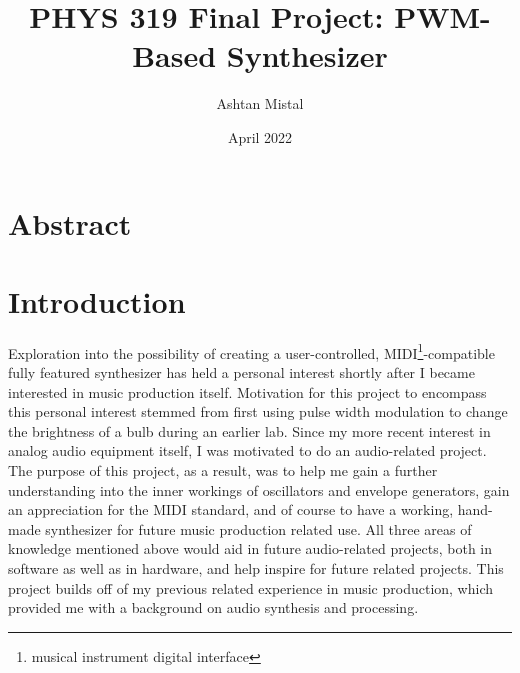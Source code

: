 \documentclass[12pt]{article}
\title{PHYS 319 Final Project: PWM-Based Synthesizer}
\author{Ashtan Mistal}
\date{April 2022}
\begin{document}
\maketitle

\break
\begin{singlespace}
\tableofcontents{}
\end{singlespace}

\break



\section{Abstract}\label{sec:abstract}


\section{Introduction}\label{sec:introduction}

Exploration into the possibility of creating a user-controlled, MIDI\footnote{musical instrument digital interface}-compatible fully featured synthesizer has held a personal interest shortly after I became interested in music production itself.
Motivation for this project to encompass this personal interest stemmed from first using pulse width modulation to change the brightness of a bulb during an earlier lab.
Since my more recent interest in analog audio equipment itself, I was motivated to do an audio-related project.
The purpose of this project, as a result, was to help me gain a further understanding into the inner workings of oscillators and envelope generators, gain an appreciation for the MIDI standard, and of course to have a working, hand-made synthesizer for future music production related use.
All three areas of knowledge mentioned above would aid in future audio-related projects, both in software as well as in hardware, and help inspire for future related projects.
This project builds off of my previous related experience in music production, which provided me with a background on audio synthesis and processing.
\end{document}
